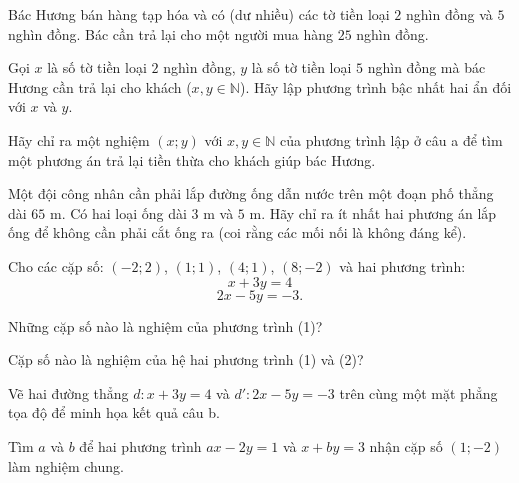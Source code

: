 \begin{practice}
\begin{questions}[series=SBT]
        \item Bác Hương bán hàng tạp hóa và có (dư nhiều) các tờ tiền loại $2$ nghìn đồng và $5$ nghìn đồng. Bác cần trả lại cho một người mua hàng $25$ nghìn đồng.
        \begin{questions}
            \item Gọi $x$ là số tờ tiền loại $2$ nghìn đồng, $y$ là số tờ tiền loại $5$ nghìn đồng mà bác Hương cần trả lại cho khách ($x,y\in\mathbb{N}$). Hãy lập phương trình bậc nhất hai ẩn đối với $x$ và $y$.
            \item Hãy chỉ ra một nghiệm $(x;y)$ với $x,y\in\mathbb{N}$ của phương trình lập ở câu a để tìm một phương án trả lại tiền thừa cho khách giúp bác Hương.
        \end{questions}
        \answerline
        \answerline

        \item Một đội công nhân cần phải lắp đường ống dẫn nước trên một đoạn phố thẳng dài $65$ m. Có hai loại ống dài $3$ m và $5$ m. Hãy chỉ ra ít nhất hai phương án lắp ống để không cần phải cắt ống ra (coi rằng các mối nối là không đáng kể).
        \answerline
        \answerline

        \item Cho các cặp số: $(-2;2)$, $(1;1)$, $(4;1)$, $(8;-2)$ và hai phương trình:
        \[
            x+3y=4 \tag{1}
        \]
        \[
            2x-5y=-3. \tag{2}
        \]
        \begin{questions}
            \item Những cặp số nào là nghiệm của phương trình (1)?
            \item Cặp số nào là nghiệm của hệ hai phương trình (1) và (2)?
            \item Vẽ hai đường thẳng $d:x+3y=4$ và $d':2x-5y=-3$ trên cùng một mặt phẳng tọa độ để minh họa kết quả câu b.
        \end{questions}
        \answerline
        \answerline
        \answerline

        \item Tìm $a$ và $b$ để hai phương trình $ax-2y=1$ và $x+by=3$ nhận cặp số $(1;-2)$ làm nghiệm chung.
        \answerline
        \answerline


\end{questions}
\end{practice}
